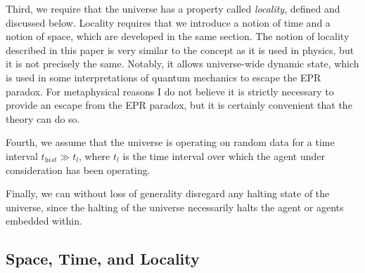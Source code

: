 \documentclass[12pt]{article}
\theoremstyle{definition}
\begin{document}
Third, we require that the universe has a property called \textit{locality},
defined and discussed below. Locality requires that we introduce a notion of
time and a notion of space\footnotemark, which are developed in the same
section. The notion of locality described in this paper is very similar to the
concept as it is used in physics, but it is not precisely the same. Notably, it
allows universe-wide dynamic state, which is used in some interpretations of
quantum mechanics to escape the EPR paradox. For metaphysical reasons I do not
believe it is strictly necessary to provide an escape from the EPR paradox, but
it is certainly convenient that the theory can do so.


Fourth, we assume that the universe is operating on random data for a time
interval \(t_\textit{hist} \gg t_l\), where \(t_l\) is the time interval over
which the agent under consideration has been operating.

Finally, we can without loss of generality disregard any halting state of the
universe, since the halting of the universe necessarily halts the agent or
agents embedded within.


\subsection{Space, Time, and Locality}
\label{sec:locality}
\end{document}
